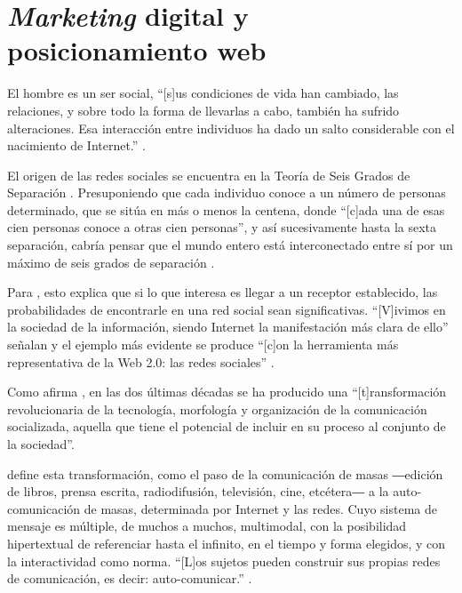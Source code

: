 \documentclass{textolivre}
\begin{document}
\section{\textit{Marketing} digital y posicionamiento web}\label{sec-marketing}
El hombre es un ser social, “[s]us condiciones de vida han cambiado, las relaciones, y sobre todo la forma de llevarlas a cabo, también ha sufrido alteraciones. Esa interacción entre individuos ha dado un salto considerable con el nacimiento de Internet.” \cite{sule_alonso_mk-2.0:_2010}.

El origen de las redes sociales se encuentra en la Teoría de Seis Grados de Separación \cite[p. 194]{sule_alonso_mk-2.0:_2010}. Presuponiendo que cada individuo conoce a un número de personas determinado, que se sitúa en más o menos la centena, donde “[c]ada una de esas cien personas conoce a otras cien personas”, y así sucesivamente hasta la sexta separación, cabría pensar que el mundo entero está interconectado entre sí por un máximo de seis grados de separación \cite{sule_alonso_mk-2.0:_2010}.

Para \textcite{sule_alonso_mk-2.0:_2010}, esto explica que si lo que interesa es llegar a un receptor establecido, las probabilidades de encontrarle en una red social sean significativas. “[V]ivimos en la sociedad de la información, siendo Internet la manifestación más clara de ello” señalan \textcite[p. 117]{bustamante_alonso_acercamiento_2017} y el ejemplo más evidente se produce “[c]on la herramienta más representativa de la Web 2.0: las redes sociales” \cite[p. 123]{arroyo-almaraz_community_2018}.

Como afirma \textcite[p. 11]{castells_prefacio:_2011}, en las dos últimas décadas se ha producido una “[t]ransformación revolucionaria de la tecnología, morfología y organización de la comunicación socializada, aquella que tiene el potencial de incluir en su proceso al conjunto de la sociedad”.

\textcite{castells_prefacio:_2011}  
define esta transformación, como el paso de la comunicación de masas ―edición de libros, prensa escrita, radiodifusión, televisión, cine, etcétera― a la auto-comunicación de masas, determinada por Internet y las redes. Cuyo sistema de mensaje es múltiple, de muchos a muchos, multimodal, con la posibilidad hipertextual de referenciar hasta el infinito, en el tiempo y forma elegidos, y con la interactividad como norma. “[L]os sujetos pueden construir sus propias redes de comunicación, es decir: auto-comunicar.” \cite[p. 12]{castells_prefacio:_2011}.
\end{document}
